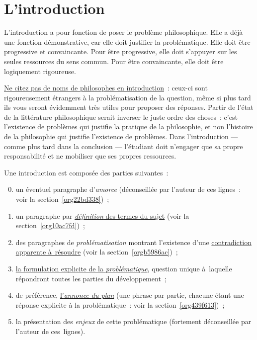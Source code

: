 \documentclass[a4paper,12pt]{report}
\begin{document}
\chapter{L'introduction}
\label{sec:org8f26b26}
\label{org3d2489c}

L'introduction a pour fonction de poser le problème philosophique. Elle
a déjà une fonction démonstrative, car elle doit justifier la
problématique. Elle doit être progressive et convaincante. Pour être
progressive, elle doit s'appuyer sur les seules ressources du sens
commun. Pour être convaincante, elle doit être logiquement rigoureuse.

\uline{Ne citez pas de noms de philosophes en introduction} : ceux-ci sont
rigoureusement étrangers à la problématisation de la question, même si
plus tard ils vous seront évidemment très utiles pour proposer des
réponses. Partir de l'état de la littérature philosophique serait
inverser le juste ordre des choses : c'est l'existence de problèmes qui
justifie la pratique de la philosophie, et non l'histoire de la
philosophie qui justifie l'existence de problèmes. Dans l'introduction
--- comme plus tard dans la conclusion --- l'étudiant doit n'engager que
sa propre responsabilité et ne mobiliser que ses propres ressources.

Une introduction est composée des parties suivantes :

\begin{enumerate}
\setcounter{enumi}{-1}
\item un éventuel paragraphe d'\emph{amorce} (déconseillée par l'auteur de
ces lignes : voir la section \ref{org22bd338}) ;

\item un paragraphe par \uline{\emph{définition} des termes du sujet} (voir la
section \ref{org10ac7fd}) ;

\item des paragraphes de \emph{problématisation} montrant l'existence d'une
\uline{contra\-diction apparente à résoudre} (voir la
section \ref{orgb5986ac}) ;

\item \uline{la formulation explicite de la \emph{problématique}}, question unique
à laquelle répondront toutes les parties du développement ;

\item de préférence, \uline{l'\emph{annonce du plan}} (une phrase par partie, chacune
étant une réponse explicite à la problématique : voir la
section \ref{org439f613}) ;

\setcounter{enumi}{-1}
\item la présentation des \emph{enjeux} de cette problématique (fortement
déconseillée par l'auteur de ces lignes).
\end{enumerate}
\end{document}
